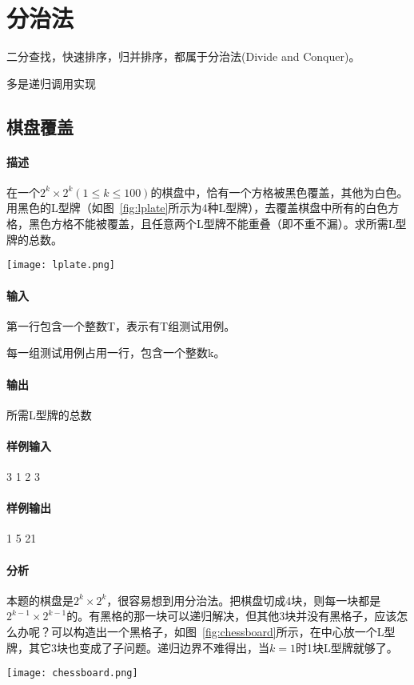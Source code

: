 \chapter{分治法}

二分查找，快速排序，归并排序，都属于分治法(Divide and Conquer)。

多是递归调用实现

\section{棋盘覆盖} %
\subsubsection{描述}
在一个$2^k \times 2^k(1 \leq k \leq 100)$的棋盘中，恰有一个方格被黑色覆盖，其他为白色。用黑色的L型牌（如图~\ref{fig:lplate}所示为4种L型牌），去覆盖棋盘中所有的白色方格，黑色方格不能被覆盖，且任意两个L型牌不能重叠（即不重不漏）。求所需L型牌的总数。

\begin{center}
\texttt{[image: lplate.png]}\\
\label{fig:lplate}
\end{center}

\subsubsection{输入}
第一行包含一个整数T，表示有T组测试用例。

每一组测试用例占用一行，包含一个整数k。

\subsubsection{输出}
所需L型牌的总数

\subsubsection{样例输入}
\begin{Code}
3
1
2
3
\end{Code}

\subsubsection{样例输出}
\begin{Code}
1
5
21
\end{Code}

\subsubsection{分析}
本题的棋盘是$2^k \times 2^k$，很容易想到用分治法。把棋盘切成4块，则每一块都是$2^{k-1} \times 2^{k-1}$的。有黑格的那一块可以递归解决，但其他3块并没有黑格子，应该怎么办呢？可以构造出一个黑格子，如图~\ref{fig:chessboard}所示，在中心放一个L型牌，其它3块也变成了子问题。递归边界不难得出，当$k=1$时1块L型牌就够了。
\begin{center}
\texttt{[image: chessboard.png]}\\
\label{fig:chessboard}
\end{center}

